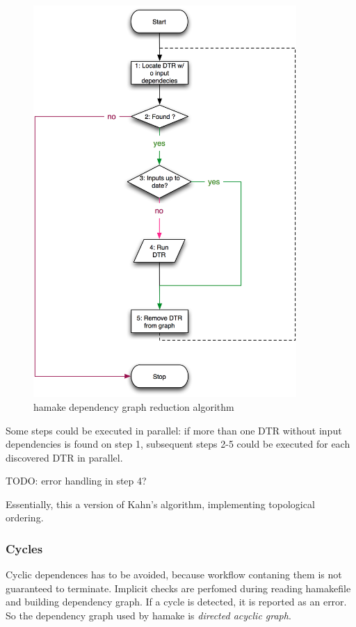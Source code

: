 \documentclass{article}
\begin{document}
\begin{figure}[htp]
\centering
\includegraphics[width=10cm]{GraphReduction.png}
\caption{hamake dependency graph reduction algorithm}
\label{fig:grred}
\end{figure}

Some steps could be executed in parallel: if more than one DTR without
input dependencies is found on step 1, subsequent steps 2-5 could be
executed for each discovered DTR in parallel.

TODO: error handling in step 4?

Essentially, this a version of Kahn's
algorithm\cite{kahn1962topological}, implementing topological
ordering\cite{wiki:topsort}.


\subsubsection{Cycles}

Cyclic dependences has to be avoided, because workflow contaning them
is not guaranteed to terminate. Implicit checks are perfomed during
reading hamakefile and building dependency graph. If a cycle is
detected, it is reported as an error. So the dependency graph used by
hamake is \textit{directed acyclic graph}.
\end{document}
